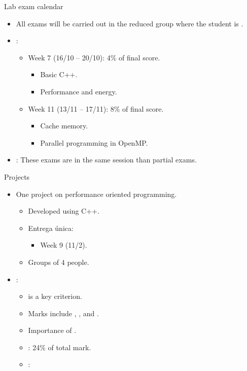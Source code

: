 \begin{frame}[t]{Lab exam calendar}
\begin{itemize}
  \item All exams will be carried out in the reduced group
        where the student is .

  \vfill
  \item {}:
  \begin{itemize}
    \item Week 7 (16/10 -- 20/10): 4\% of final score.
      \begin{itemize}
        \item Basic C++.
        \item Performance and energy.
      \end{itemize}
    \item Week 11 (13/11 -- 17/11): 8\% of final score.
      \begin{itemize}
        \item Cache memory.
        \item Parallel programming in OpenMP.
      \end{itemize}
  \end{itemize}

  \item {}: These exams are in the same session
        than partial exams.
\end{itemize}
\end{frame}

\begin{frame}[t]{Projects}
\begin{itemize}
  \item One project on performance oriented programming.
    \begin{itemize}
        \item Developed using C++.
        \item Entrega única:
        \begin{itemize}
          \item Week 9 (11/2).
        \end{itemize}
        \item Groups of 4 people.
    \end{itemize}

    \item {}:
      \begin{itemize}
        \item {} is a key criterion.
        \item Marks include , , 
              and .
        \item Importance of .
        \item {}: 24\% of total mark.
        \item {}: 
    \end{itemize}
\end{itemize}
\end{frame}

